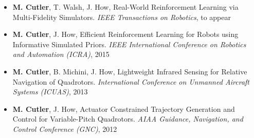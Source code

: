 \documentclass[letterpaper]{deedy-resume} %
\begin{document}
\begin{minipage}[t]{0.62\textwidth}
\begin{itemize}
\item \textbf{M. Cutler}, T. Walsh, J. How, Real-World Reinforcement Learning
  via Multi-Fidelity Simulators. \emph{IEEE Transactions on Robotics}, to
  appear
\item \textbf{M. Cutler}, J. How, Efficient Reinforcement Learning for Robots
  using Informative Simulated Priors. \emph{IEEE International Conference on
    Robotics and Automation (ICRA)}, 2015
\item \textbf{M. Cutler}, B. Michini, J. How, Lightweight Infrared Sensing for
  Relative Navigation of Quadrotors. \emph{International Conference on Unmanned
  Aircraft Systems (ICUAS)}, 2013
\item \textbf{M. Cutler}, J. How, Actuator Constrained Trajectory Generation
  and Control for Variable-Pitch Quadrotors. \emph{AIAA Guidance, Navigation,
    and Control Conference (GNC)}, 2012
\end{itemize}


%
%
%
%
%


\end{minipage}
\end{document}
